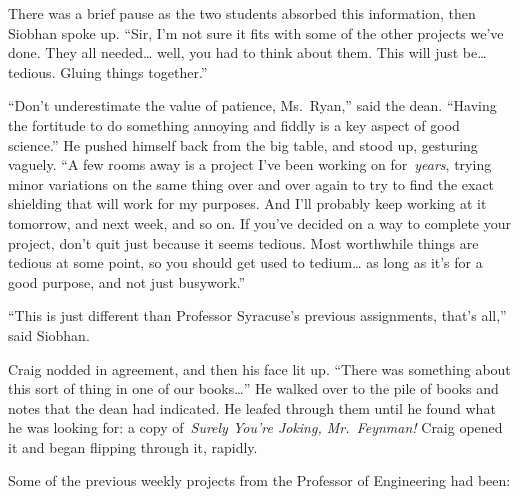 There was a brief pause as the two students absorbed this information,
then Siobhan spoke up. ``Sir, I'm not sure it fits with some of the
other projects we've done. They all needed\ldots{} well, you had to
think about them. This will just be\ldots{} tedious. Gluing things
together.''

``Don't underestimate the value of patience, Ms.~Ryan,'' said the dean.
``Having the fortitude to do something annoying and fiddly is a key
aspect of good science.'' He pushed himself back from the big table, and
stood up, gesturing vaguely. ``A few rooms away is a project I've been
working on for~\emph{years}, trying minor variations on the same thing
over and over again to try to find the exact shielding that will work
for my purposes. And I'll probably keep working at it tomorrow, and next
week, and so on. If you've decided on a way to complete your project,
don't quit just because it seems tedious. Most worthwhile things are
tedious at some point, so you should get used to tedium\ldots{} as long
as it's for a good purpose, and not just busywork.''

``This is just different than Professor Syracuse's previous assignments,
that's all,'' said Siobhan.

Craig nodded in agreement, and then his face lit up. ``There was
something about this sort of thing in one of our books\ldots{}'' He
walked over to the pile of books and notes that the dean had indicated.
He leafed through them until he found what he was looking for: a copy
of~\emph{Surely You're Joking, Mr.~Feynman!} Craig opened it and began
flipping through it, rapidly.

Some of the previous weekly projects from the Professor of Engineering
had been:

